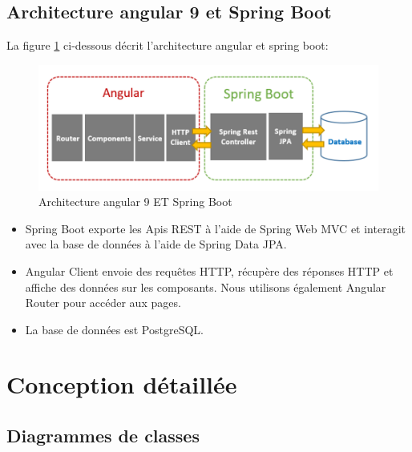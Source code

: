 \subsection{	Architecture angular 9 et Spring Boot}
\hspace{4mm}La ﬁgure \ref{fig:spring_boot} ci-dessous décrit l'architecture angular et spring boot:
\begin{figure}[h]
    \centering
    \includegraphics{figures/3anis3.png}
    \caption{Architecture angular 9 ET Spring Boot \cite{13}}
    \label{fig:spring_boot}
\end{figure}
\begin{itemize}
    \item	Spring Boot exporte les Apis REST à l'aide de Spring Web MVC et interagit avec la base de données à l'aide de Spring Data JPA.
    \item Angular Client envoie des requêtes HTTP, récupère des réponses HTTP et affiche des données sur les composants. Nous utilisons également Angular Router pour accéder aux pages.
    \item 	La base de données est PostgreSQL.
\end{itemize}
\section{Conception détaillée}
\subsection{	Diagrammes de classes }
